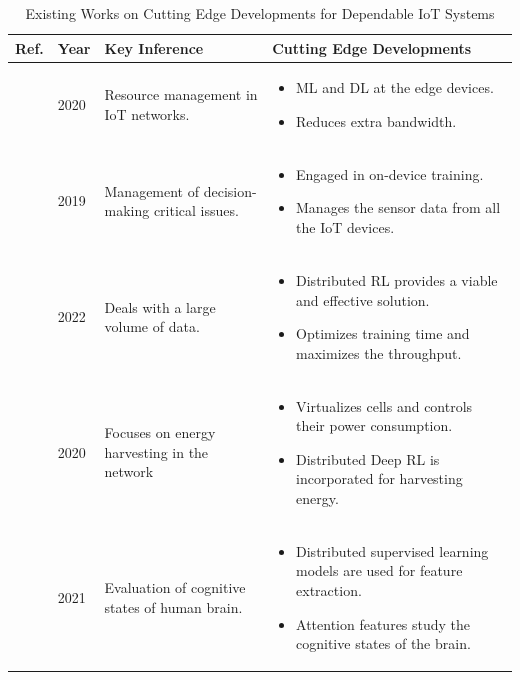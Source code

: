 \documentclass[journal]{IEEEtran}
\begin{document}
\begin{table}[!ht]
\centering
\caption{Existing Works on Cutting Edge Developments for Dependable IoT Systems} 
\label{tab:cuttingedge}
\begin{tabular}{|p{0.75cm}|p{0.5cm}|p{6.0cm}|p{9.0cm}|}
\hline
\textbf{Ref.} & \textbf{Year} & \textbf{Key Inference} & \textbf{Cutting Edge Developments}\\ \hline
\hline
\cite{hussain2020machine}  & 2020 & Resource management in IoT networks. &  
\begin{itemize}
    \item ML and DL at the edge devices.
    \item Reduces extra bandwidth.
\end{itemize}
\\ \hline
\cite{yao2019recommendations}  & 2019 & Management of decision-making critical issues. &  
\begin{itemize}
    \item Engaged in on-device training.
    \item Manages the sensor data from all the IoT devices.
\end{itemize}
\\ \hline
\cite{wang2022distributed}  & 2022 & Deals with a large volume of data. &  
\begin{itemize}
    \item Distributed RL provides a viable and effective solution.
    \item Optimizes training time and maximizes the throughput.
\end{itemize}
\\ \hline
\cite{temesgene2020distributed}  & 2020 & Focuses on energy harvesting in the network &  
\begin{itemize}
    \item Virtualizes cells and controls their power consumption. 
    \item Distributed Deep RL is incorporated for harvesting energy.
\end{itemize}
\\ \hline
\cite{grossberg2021attention}  & 2021 & Evaluation of cognitive states of human brain.  &  
\begin{itemize}
    \item Distributed supervised learning models are used for feature extraction.
    \item Attention features study the cognitive states of the brain.

\end{itemize}
\end{tabular}
\end{table}
\end{document}
